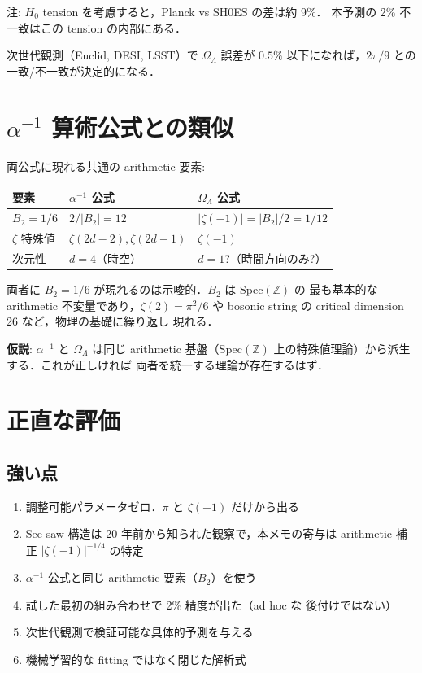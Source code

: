 \documentclass[11pt,a4paper]{article}
\begin{document}
注: $H_0$ tension を考慮すると，Planck vs SH0ES の差は約 9\%．
本予測の 2\% 不一致はこの tension の内部にある．

次世代観測（Euclid, DESI, LSST）で $\Omega_\Lambda$ 誤差が
$0.5\%$ 以下になれば，$2\pi/9$ との一致/不一致が決定的になる．

\section{$\alpha^{-1}$ 算術公式との類似}

両公式に現れる共通の arithmetic 要素:

\begin{center}
\begin{tabular}{lll}
\toprule
要素 & $\alpha^{-1}$ 公式 & $\Omega_\Lambda$ 公式 \\
\midrule
$B_2 = 1/6$ & $2/|B_2| = 12$ & $|\zeta(-1)| = |B_2|/2 = 1/12$ \\
$\zeta$ 特殊値 & $\zeta(2d-2), \zeta(2d-1)$ & $\zeta(-1)$ \\
次元性 & $d = 4$（時空）& $d = 1$?（時間方向のみ?） \\
\bottomrule
\end{tabular}
\end{center}

両者に $B_2 = 1/6$ が現れるのは示唆的．$B_2$ は Spec$(\mathbb{Z})$ の
最も基本的な arithmetic 不変量であり，$\zeta(2) = \pi^2/6$ や
bosonic string の critical dimension 26 など，物理の基礎に繰り返し
現れる．

\textbf{仮説}: $\alpha^{-1}$ と $\Omega_\Lambda$ は同じ arithmetic
基盤（Spec$(\mathbb{Z})$ 上の特殊値理論）から派生する．これが正しければ
両者を統一する理論が存在するはず．

\section{正直な評価}

\subsection{強い点}

\begin{enumerate}
\item 調整可能パラメータゼロ．$\pi$ と $\zeta(-1)$ だけから出る
\item See-saw 構造は 20 年前から知られた観察で，本メモの寄与は
arithmetic 補正 $|\zeta(-1)|^{-1/4}$ の特定
\item $\alpha^{-1}$ 公式と同じ arithmetic 要素（$B_2$）を使う
\item 試した最初の組み合わせで 2\% 精度が出た（ad hoc な
後付けではない）
\item 次世代観測で検証可能な具体的予測を与える
\item 機械学習的な fitting ではなく閉じた解析式
\end{enumerate}
\end{document}
